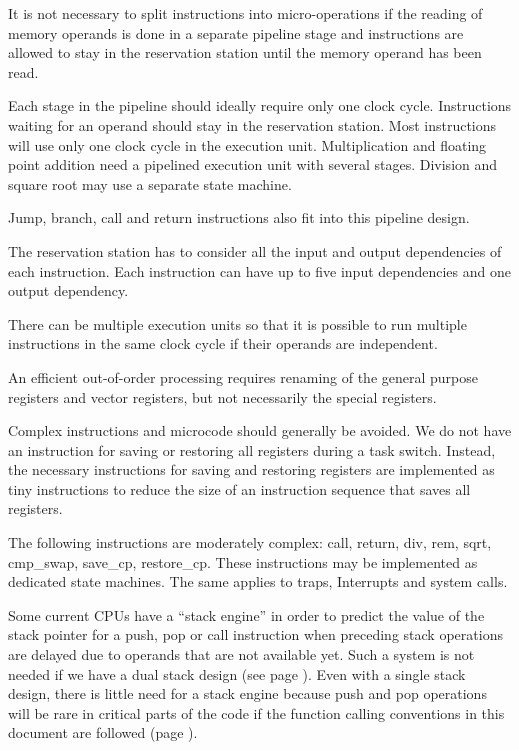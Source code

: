 \documentclass[forwardcom.tex]{subfiles}
\begin{document}
It is not necessary to split instructions into micro-operations if the reading of memory operands is done in a separate pipeline stage and instructions are allowed to stay in the reservation station until the memory operand has been read. 
\vspace{2mm}

Each stage in the pipeline should ideally require only one clock cycle. Instructions waiting for an operand should stay in the reservation station. Most instructions will use only one clock cycle in the execution unit. Multiplication and floating point addition need a pipelined execution unit with several stages. Division and square root may use a separate state machine. 
\vspace{2mm}

Jump, branch, call and return instructions also fit into this pipeline design. 
\vspace{2mm}

The reservation station has to consider all the input and output dependencies of each instruction. Each instruction can have up to five input dependencies and one output dependency. 
\vspace{2mm}

There can be multiple execution units so that it is possible to run multiple instructions in the same clock cycle if their operands are independent. 
\vspace{2mm}

An efficient out-of-order processing requires renaming of the general purpose registers and vector registers, but not necessarily the special registers. 
\vspace{2mm}

Complex instructions and microcode should generally be avoided. We do not have an instruction for saving or restoring all registers during a task switch. Instead, the necessary instructions for saving and restoring registers are implemented as tiny instructions to reduce the size of an instruction sequence that saves all registers. 
\vspace{2mm}

The following instructions are moderately complex: call, return, div, rem, sqrt, cmp\_swap, save\_cp, restore\_cp. These instructions may be implemented as dedicated state machines. The same applies to traps, Interrupts and system calls. 
\vspace{2mm}

Some current CPUs have a ``stack engine'' in order to predict the value of the stack pointer for a push, pop or call instruction when preceding stack operations are delayed due to operands that are not available yet. Such a system is not needed if we have a dual stack design (see page \pageref{dualStack}). Even with a single stack design, there is little need for a stack engine because push and pop operations will be rare in critical parts of the code if the function calling conventions in this document are followed (page \pageref{functionCallingConventions}). 
\vspace{2mm}
\end{document}
